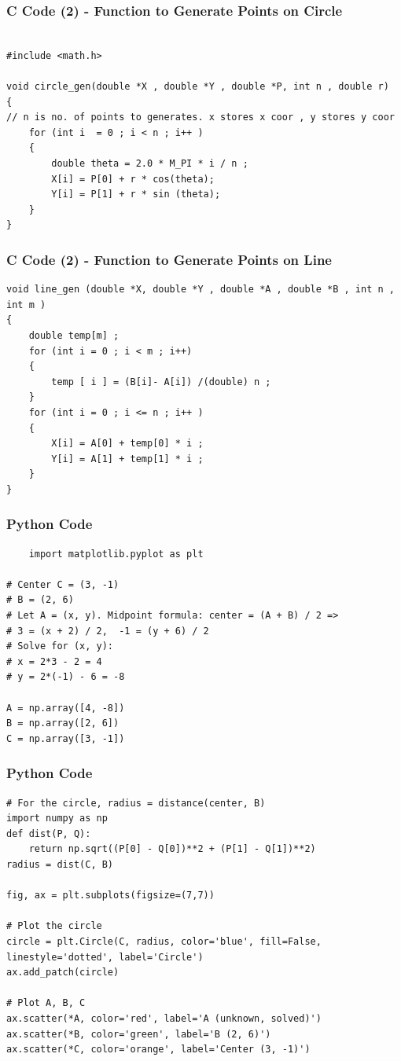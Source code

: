 \documentclass{beamer}
\begin{document}
\begin{frame}[fragile]
    \frametitle{C Code (2) - Function to Generate Points on Circle}

    \begin{lstlisting}

#include <math.h>

void circle_gen(double *X , double *Y , double *P, int n , double r)
{
// n is no. of points to generates. x stores x coor , y stores y coor 
    for (int i  = 0 ; i < n ; i++ )
    {
        double theta = 2.0 * M_PI * i / n ; 
        X[i] = P[0] + r * cos(theta);
        Y[i] = P[1] + r * sin (theta); 
    }   
}
    \end{lstlisting}
\end{frame}
\begin{frame}[fragile]
    \frametitle{C Code (2) - Function to Generate Points on Line}

    \begin{lstlisting}
void line_gen (double *X, double *Y , double *A , double *B , int n , int m )
{
    double temp[m] ; 
    for (int i = 0 ; i < m ; i++)
    {
        temp [ i ] = (B[i]- A[i]) /(double) n ; 
    }
    for (int i = 0 ; i <= n ; i++ )
    {
        X[i] = A[0] + temp[0] * i ; 
        Y[i] = A[1] + temp[1] * i ;
    }
}

    \end{lstlisting}
\end{frame}
\begin{frame}[fragile]
    \frametitle{Python Code}
    \begin{lstlisting}
    import matplotlib.pyplot as plt

# Center C = (3, -1)
# B = (2, 6)
# Let A = (x, y). Midpoint formula: center = (A + B) / 2 =>
# 3 = (x + 2) / 2,  -1 = (y + 6) / 2
# Solve for (x, y):
# x = 2*3 - 2 = 4
# y = 2*(-1) - 6 = -8

A = np.array([4, -8])
B = np.array([2, 6])
C = np.array([3, -1])
\end{lstlisting}
\end{frame}

\begin{frame}[fragile]
    \frametitle{Python Code}

    \begin{lstlisting}
# For the circle, radius = distance(center, B)
import numpy as np
def dist(P, Q):
    return np.sqrt((P[0] - Q[0])**2 + (P[1] - Q[1])**2)
radius = dist(C, B)

fig, ax = plt.subplots(figsize=(7,7))

# Plot the circle
circle = plt.Circle(C, radius, color='blue', fill=False, linestyle='dotted', label='Circle')
ax.add_patch(circle)

# Plot A, B, C
ax.scatter(*A, color='red', label='A (unknown, solved)')
ax.scatter(*B, color='green', label='B (2, 6)')
ax.scatter(*C, color='orange', label='Center (3, -1)')



    \end{lstlisting}
\end{frame}
\end{document}
